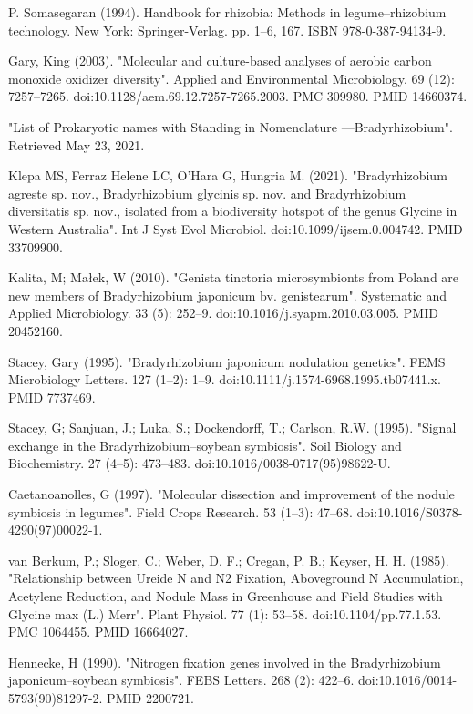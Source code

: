 \documentclass[11pt]{article}
\begin{document}
\begin{thebibliography}{3}
	 P. Somasegaran (1994). Handbook for rhizobia: Methods in legume–rhizobium technology. New York: Springer-Verlag. pp. 1–6, 167. ISBN 978-0-387-94134-9.
	
	 Gary, King (2003). "Molecular and culture-based analyses of aerobic carbon monoxide oxidizer diversity". Applied and Environmental Microbiology. 69 (12): 7257–7265. doi:10.1128/aem.69.12.7257-7265.2003. PMC 309980. PMID 14660374.
	
	 "List of Prokaryotic names with Standing in Nomenclature —Bradyrhizobium". Retrieved May 23, 2021.
	
	 Klepa MS, Ferraz Helene LC, O'Hara G, Hungria M. (2021). "Bradyrhizobium agreste sp. nov., Bradyrhizobium glycinis sp. nov. and Bradyrhizobium diversitatis sp. nov., isolated from a biodiversity hotspot of the genus Glycine in Western Australia". Int J Syst Evol Microbiol. doi:10.1099/ijsem.0.004742. PMID 33709900.
	
	 Kalita, M; Małek, W (2010). "Genista tinctoria microsymbionts from Poland are new members of Bradyrhizobium japonicum bv. genistearum". Systematic and Applied Microbiology. 33 (5): 252–9. doi:10.1016/j.syapm.2010.03.005. PMID 20452160.
	
	 Stacey, Gary (1995). "Bradyrhizobium japonicum nodulation genetics". FEMS Microbiology Letters. 127 (1–2): 1–9. doi:10.1111/j.1574-6968.1995.tb07441.x. PMID 7737469.
	
	 Stacey, G; Sanjuan, J.; Luka, S.; Dockendorff, T.; Carlson, R.W. (1995). "Signal exchange in the Bradyrhizobium–soybean symbiosis". Soil Biology and Biochemistry. 27 (4–5): 473–483. doi:10.1016/0038-0717(95)98622-U.
	
	 Caetanoanolles, G (1997). "Molecular dissection and improvement of the nodule symbiosis in legumes". Field Crops Research. 53 (1–3): 47–68. doi:10.1016/S0378-4290(97)00022-1.
	
	 van Berkum, P.; Sloger, C.; Weber, D. F.; Cregan, P. B.; Keyser, H. H. (1985). "Relationship between Ureide N and N2 Fixation, Aboveground N Accumulation, Acetylene Reduction, and Nodule Mass in Greenhouse and Field Studies with Glycine max (L.) Merr". Plant Physiol. 77 (1): 53–58. doi:10.1104/pp.77.1.53. PMC 1064455. PMID 16664027.
	
	 Hennecke, H (1990). "Nitrogen fixation genes involved in the Bradyrhizobium japonicum–soybean symbiosis". FEBS Letters. 268 (2): 422–6. doi:10.1016/0014-5793(90)81297-2. PMID 2200721.
	

\end{thebibliography}
\end{document}
